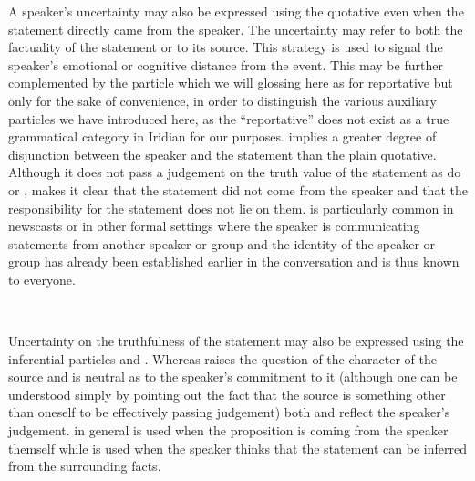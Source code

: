 A speaker’s uncertainty may also be expressed using the quotative even when the
statement directly came from the speaker. The uncertainty may refer to both the
factuality of the statement or to its source. This strategy is used to signal
the speaker’s emotional or cognitive distance from the event. This may be
further complemented by the particle  which we will glossing here as
\Rep{} for reportative but only for the sake of convenience, in order to
distinguish the various auxiliary particles we have introduced here, as the
“reportative” does not exist as a true grammatical category in Iridian for our
purposes.  implies a greater degree of disjunction between the speaker
and the statement than the plain quotative. Although it does not pass a
judgement on the truth value of the statement as do  or ,
 makes it clear that the statement did not come from the speaker and
that the responsibility for the statement does not lie on them.  is
particularly common in newscasts or in other formal settings where the speaker
is communicating statements from another speaker or group and the identity of
the speaker or group has already been established earlier in the conversation
and is thus known to everyone.

\pex
{}\smallskip\\
{\footnotesize{}}
\xe

Uncertainty on the truthfulness of the statement may also be expressed using the
inferential particles  and . Whereas  raises the
question of the character of the source and is neutral as to the speaker’s
commitment to it (although one can be understood simply by pointing out the fact
that the source is something other than oneself to be effectively passing
judgement) both  and  reflect the speaker’s judgement.
 in general is used when the proposition is coming from the speaker
themself while  is used when the speaker thinks that the statement
can be inferred from the surrounding facts.

